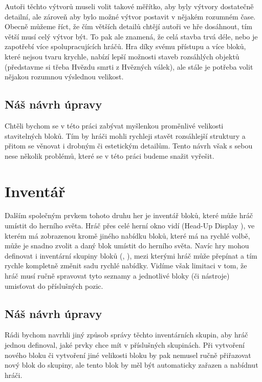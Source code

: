 Autoři těchto výtvorů museli volit takové měřítko, aby byly výtvory dostatečně detailní, ale zároveň aby bylo možné výtvor postavit v nějakém rozumném čase. Obecně můžeme říct, že čím větších detailů chtějí autoři ve hře \MC{} dosáhnout, tím větší musí celý výtvor být. To pak ale znamená, že celá stavba trvá déle, nebo je zapotřebí více spolupracujících hráčů. Hra \SE{} díky svému přístupu a více bloků, které nejsou tvaru krychle, nabízí lepší možnosti staveb rozsáhlých objektů (představme si třeba Hvězdu smrti z Hvězných válek), ale stále je potřeba volit nějakou rozumnou výslednou velikost.


\subsection{Náš návrh úpravy}
Chtěli bychom se v této práci zabývat myšlenkou proměnlivé velikosti stavitelných bloků. Tím by hráči mohli rychleji stavět rozsáhlejší struktury a přitom se věnovat i drobným či estetickým detailům. Tento návrh však s sebou nese několik problémů, které se v této práci budeme snažit vyřešit.


\section{Inventář}
Dalším společným prvkem tohoto druhu her je inventář bloků, které může hráč umístit do herního světa. Hráč přes celé herní okno vidí \HUD{} (Head-Up Display \citep{hud_terminology}), ve kterém má zobrazenou kromě jiného nabídku bloků, které má na rychlé volbě, může je snadno zvolit a daný blok umístit do herního světa. Navíc hry mohou definovat i inventární skupiny bloků (\SE{}, \ME{}), mezi kterými hráč může přepínat a tím rychle kompletně změnit sadu rychlé nabídky. Vidíme však limitaci v tom, že hráč musí ručně spravovat tyto seznamy a jednotlivé bloky (či nástroje) umisťovat do příslušných pozic.


\subsection{Náš návrh úpravy}
Rádi bychom navrhli jiný způsob správy těchto inventárních skupin, aby hráč jednou definoval, jaké prvky chce mít v příslušných skupinách. Při vytvoření nového bloku či vytvoření jiné velikosti bloku by pak nemusel ručně přiřazovat nový blok do skupiny, ale tento blok by měl být automaticky zařazen a nabídnut hráči.  





